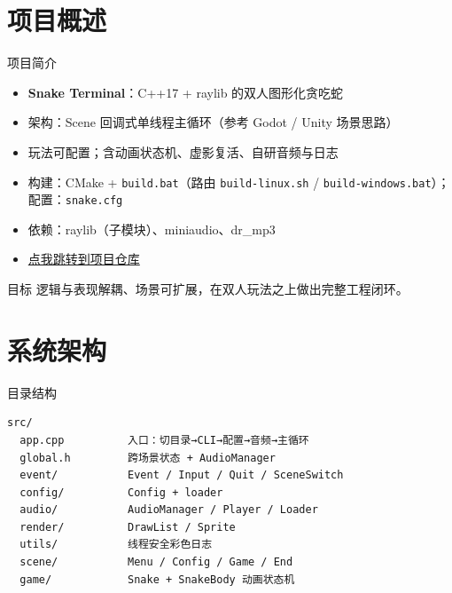 \documentclass[aspectratio=169,13pt]{beamer}
\begin{document}
\section{项目概述}

\begin{frame}{项目简介}
  \begin{itemize}
    \item \textbf{Snake Terminal}：C++17 + raylib 的双人图形化贪吃蛇
    \item 架构：Scene 回调式单线程主循环（参考 Godot / Unity 场景思路）
    \item 玩法可配置；含动画状态机、虚影复活、自研音频与日志
    \item 构建：CMake + \texttt{build.bat}（路由 \texttt{build-linux.sh} / \texttt{build-windows.bat}）；配置：\texttt{snake.cfg}
    \item 依赖：raylib（子模块）、miniaudio、dr\_mp3
    \item \href{https://github.com/CommandPrompt-Wang/snake_terminal_pub}{点我跳转到项目仓库}
  \end{itemize}

  \vspace{0.4em}
  \begin{block}{目标}
    逻辑与表现解耦、场景可扩展，在双人玩法之上做出完整工程闭环。
  \end{block}
\end{frame}

\section{系统架构}

\begin{frame}[fragile]{目录结构}
\begin{verbatim}
src/
  app.cpp          入口：切目录→CLI→配置→音频→主循环
  global.h         跨场景状态 + AudioManager
  event/           Event / Input / Quit / SceneSwitch
  config/          Config + loader
  audio/           AudioManager / Player / Loader
  render/          DrawList / Sprite
  utils/           线程安全彩色日志
  scene/           Menu / Config / Game / End
  game/            Snake + SnakeBody 动画状态机
\end{verbatim}
\end{frame}
\end{document}
